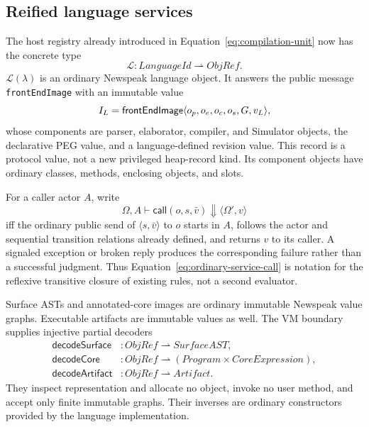 \subsection{Reified language services}
\label{sec:reified-front-ends}

The host registry already introduced in Equation~\eqref{eq:compilation-unit}
now has the concrete type
\begin{equation}\label{eq:language-registry}
 \mathcal L:\mathit{LanguageId}\rightharpoonup\mathit{ObjRef}.
\end{equation}
$\mathcal L(\lambda)$ is an ordinary Newspeak language object.  It answers the
public message \texttt{frontEndImage} with an immutable value
\begin{equation}\label{eq:front-end-image}
 I_L=\mathsf{frontEndImage}\langle o_p,o_e,o_c,o_s,G,v_L\rangle,
\end{equation}
whose components are parser, elaborator, compiler, and Simulator objects, the
declarative PEG value, and a language-defined revision value.  This record is
a protocol value, not a new privileged heap-record kind.  Its component
objects have ordinary classes, methods, enclosing objects, and slots.

For a caller actor $A$, write
\begin{equation}\label{eq:ordinary-service-call}
 \Omega,A\vdash\mathsf{call}(o,s,\bar v)
    \Downarrow\langle\Omega',v\rangle
\end{equation}
iff the ordinary public send of $\langle s,\bar v\rangle$ to $o$ starts in
$A$, follows the actor and sequential transition relations already defined,
and returns $v$ to its caller.  A signaled exception or broken reply produces
the corresponding failure rather than a successful judgment.  Thus
Equation~\eqref{eq:ordinary-service-call} is notation for the reflexive
transitive closure of existing rules, not a second evaluator.

Surface ASTs and annotated-core images are ordinary immutable Newspeak value
graphs.  Executable artifacts are immutable values as well.  The VM boundary
supplies injective partial
decoders
\begin{equation}\label{eq:front-end-value-decoders}
\begin{aligned}
 \mathsf{decodeSurface}&:\mathit{ObjRef}\rightharpoonup\mathit{SurfaceAST},\\
 \mathsf{decodeCore}&:\mathit{ObjRef}\rightharpoonup
        (\mathit{Program}\times\mathit{CoreExpression}),\\
 \mathsf{decodeArtifact}&:\mathit{ObjRef}\rightharpoonup\mathit{Artifact}.
\end{aligned}
\end{equation}
They inspect representation and allocate no object, invoke no user method, and
accept only finite immutable graphs.  Their inverses are ordinary constructors
provided by the language implementation.

